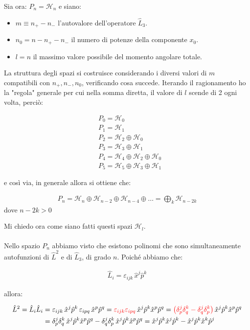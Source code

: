 	Sia ora: $P_n = \mathcal{H}_n$ e siano:

\begin{itemize}
	\item $ m \equiv n_+ - n_-$ l'autovalore dell'operatore $\hat{L}_3$.
	\item $ n_0 = n - n_+ - n_-$ il numero di potenze della componente $x_0$.
	\item $ l = n $ il massimo valore possibile del momento angolare totale.
\end{itemize}

	La struttura degli spazi si costruisce considerando i diversi valori di $m$ compatibili con $n_+, n_-, n_0$, verificando cosa succede. 
	Iterando il ragionamento ho la "regola" generale per cui nella somma diretta, il valore di $l$ scende di 2 ogni volta, perciò:

\begin{align*}
	& P_0 = \mathcal{H}_0 \\
	& P_1 = \mathcal{H}_1   \\
	& P_2 = \mathcal{H}_2 \oplus \mathcal{H}_0 \\
	& P_3 = \mathcal{H}_3 \oplus \mathcal{H}_1 \\
	& P_4 = \mathcal{H}_4 \oplus \mathcal{H}_2 \oplus \mathcal{H}_0 \\
	& P_5 = \mathcal{H}_5 \oplus \mathcal{H}_3 \oplus \mathcal{H}_1
\end{align*}

	e così via, in generale allora si ottiene che:
	
\begin{nb}
\begin{align*}
	P_n = \mathcal{H}_n \oplus \mathcal{H}_{n-2} \oplus \mathcal{H}_{n-4} \oplus \dots = \bigoplus_k \mathcal{H}_{n-2k}
\end{align*}
	dove $n - 2k > 0$
\end{nb}

	Mi chiedo ora come siano fatti questi spazi $\mathcal{H}_l$.
	\\
	\\
	Nello spazio $P_n$ abbiamo visto che esistono polinomi che sono simultaneamente autofunzioni di $\hat{L}^2$ e di $\hat{L}_3$, di grado $n$. Poiché abbiamo che:

\begin{align*}
	\hat{L}_i = \varepsilon_{ijk} \, \hat{x}^j \hat{p}^k
\end{align*}

	allora:
	
\begin{align*}
	\hat{L}^2 = \hat{L}_i \hat{L}_i &= \varepsilon_{ijk} \, \hat{x}^j \hat{p}^k \, \varepsilon_{ipq} \, \hat{x}^p \hat{p}^q = \textcolor{red}{\varepsilon_{ijk} \varepsilon_{ipq}} \,  \hat{x}^j \hat{p}^k \hat{x}^p \hat{p}^q = \textcolor{red}{\qty(\delta_p^j \delta_q^k - \delta_q^j \delta_p^k)} \,  \hat{x}^j \hat{p}^k \hat{x}^p \hat{p}^q \\
	 &= \delta_p^j \delta_q^k \, \hat{x}^j \hat{p}^k \hat{x}^p \hat{p}^q - \delta_q^j \delta_p^k \, \hat{x}^j \hat{p}^k \hat{x}^p \hat{p}^q = \hat{x}^j \hat{p}^k \hat{x}^j \hat{p}^k - \hat{x}^j \hat{p}^k \hat{x}^k \hat{p}^j
\end{align*}

